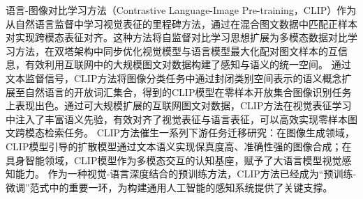 语言-图像对比学习方法\cite{radford2021learning}（Contrastive Language-Image Pre-training，CLIP）作为从自然语言监督中学习视觉表征的里程碑方法，通过在混合图文数据中匹配正样本对实现跨模态表征对齐。这种方法将自监督对比学习思想扩展为多模态数据对比学习方法，在双塔架构中同步优化视觉模型\cite{dosovitskiy2020vit,resnet}与语言模型\cite{Transformer}最大化配对图文样本的互信息，有效利用互联网中的大规模图文对数据构建了感知与语义的统一空间。
通过文本监督信号，CLIP方法将图像分类任务中通过封闭类别空间表示的语义概念扩展至自然语言的开放词汇集合，得到的CLIP模型在零样本开放集合图像识别任务上表现出色。通过可大规模扩展的互联网图文对数据，CLIP方法在视觉表征学习中注入了丰富语义先验，有效对齐了视觉表征与语言表征，可以高效实现零样本图文跨模态检索任务。
CLIP方法催生一系列下游任务迁移研究：在图像生成领域，CLIP模型引导的扩散模型\cite{dall-e2}通过文本语义实现保真度高、准确性强的图像合成；在具身智能领域，CLIP模型作为多模态交互的认知基座\cite{llava}，赋予了大语言模型视觉感知能力。
作为一种视觉-语言深度结合的预训练方法，CLIP方法已经成为“预训练-微调”范式中的重要一环，为构建通用人工智能的感知系统提供了关键支撑。




